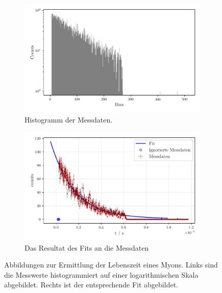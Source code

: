 \begin{figure}%
    \begin{subfigure}{0.5\textwidth}%
    \centering%
    \includegraphics[width=\textwidth]{build/myonenhist.pdf}%
    \caption{Histogramm der Messdaten.}%
    \label{fig:histogramm}%
    \end{subfigure}%
    \hfill%
    \begin{subfigure}{0.5\textwidth}%
        \centering%
        \includegraphics[width=\textwidth]{build/myonenfit.pdf}%
        \caption{Das Resultat des Fits an die Messdaten}%
        \label{fig:myonenfit}%
        \end{subfigure}%
    \caption{Abbildungen zur Ermittlung der Lebenszeit eines Myons.
    Links sind die Messwerte histogrammiert auf einer logarithmischen Skala abgebildet.
    Rechts ist der entsprechende Fit abgebildet.}
    \label{subfig:myonen}    
\end{figure}%

